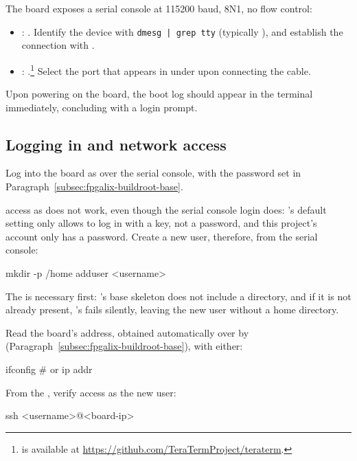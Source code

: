 The board exposes a serial console at 115200 baud, 8N1, no flow control:

\begin{itemize}
    \item {}: . Identify the device with \lstinline[style=githubcppinline]!dmesg | grep tty! (typically ), and establish the connection with .
    \item {}: .\footnote{ is available at \url{https://github.com/TeraTermProject/teraterm}.} Select the  port that appears in  under  upon connecting the cable.
\end{itemize}

Upon powering on the board, the boot log should appear in the terminal immediately, concluding with a login prompt.

\subsection{Logging in and network access}
\label{subsec:fpgalix-login-network}

Log into the board as  over the serial console, with the password set in Paragraph~\ref{subsec:fpgalix-buildroot-base}.

 access as  does not work, even though the serial console login does: 's default  setting only allows  to log in with a key, not a password, and this project's  account only has a password. Create a new user, therefore, from the serial console:

\begin{shellcodeboard}
mkdir -p /home
adduser <username>
\end{shellcodeboard}

The  is necessary first: 's base skeleton does not include a  directory, and if it is not already present, 's  fails silently, leaving the new user without a home directory.

Read the board's  address, obtained automatically over  by  (Paragraph~\ref{subsec:fpgalix-buildroot-base}), with either:

\begin{shellcodeboard}
ifconfig
# or
ip addr
\end{shellcodeboard}

From the , verify  access as the new user:

\begin{shellcodehost}
ssh <username>@<board-ip>
\end{shellcodehost}

